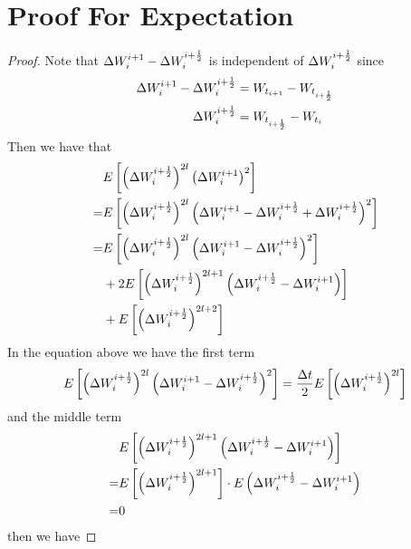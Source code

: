     \section{Proof For Expectation}
    \label{sec:proof for expectation}
    \begin{proof}
        Note that $\Delta W_{i}^{i+1}-\Delta W_{i}^{i+\frac{1}{2}}$ is independent of $\Delta W_{i}^{i+\frac{1}{2}}$ 
        since
        \[\begin{aligned}
            \Delta W_{i}^{i+1}-\Delta W_{i}^{i+\frac{1}{2}}&=W_{t_{i+1}}-W_{t_{i+\frac{1}{2}}}\\
            \Delta W_{i}^{i+\frac{1}{2}}&=W_{t_{i+\frac{1}{2}}}-W_{t_i}
        \end{aligned}\]
        Then we have that
        \[\begin{aligned}
            &E\left[
            \left(\Delta W_{i}^{i+\frac{1}{2}}\right)^{2l}
            \left(\Delta W_{i}^{i+1}\right)^2
            \right]\\
            =&E\left[
            \left(\Delta W_{i}^{i+\frac{1}{2}}\right)^{2l}
            \left(\Delta W_{i}^{i+1}-\Delta W_{i}^{i+\frac{1}{2}}+\Delta W_{i}^{i+\frac{1}{2}}\right)^2
            \right]\\
            =&\begin{aligned}[t]
            &E\left[
            \left(\Delta W_{i}^{i+\frac{1}{2}}\right)^{2l}\left(\Delta W_{i}^{i+1}-\Delta W_{i}^{i+\frac{1}{2}}\right)^2
            \right]\\
            &+2E\left[
            \left(\Delta W_{i}^{i+\frac{1}{2}}\right)^{2l+1}\left(\Delta W_{i}^{i+\frac{1}{2}}-\Delta W_{i}^{i+1}\right)
            \right]\\
            &+E\left[\left(\Delta W_{i}^{i+\frac{1}{2}}\right)^{2l+2}\right]\\
            \end{aligned}\\
        \end{aligned}\]
        In the equation above we have the first term
        \[\begin{aligned}
            E\left[
            \left(\Delta W_{i}^{i+\frac{1}{2}}\right)^{2l}\left(\Delta W_{i}^{i+1}-\Delta W_{i}^{i+\frac{1}{2}}\right)^2
            \right]
            =\frac{\Delta t}{2}E\left[\left(\Delta W_{i}^{i+\frac{1}{2}}\right)^{2l}\right]
        \end{aligned}\]
        and the middle term
        \[\begin{aligned}
            &E\left[\left(\Delta W_{i}^{i+\frac{1}{2}}\right)^{2l+1}\left(\Delta W_{i}^{i+\frac{1}{2}}-\Delta W_{i}^{i+1}\right)\right]\\
            =&
            E\left[\left(\Delta W_{i}^{i+\frac{1}{2}}\right)^{2l+1}\right]
            \cdot E\left(\Delta W_{i}^{i+\frac{1}{2}}-\Delta W_{i}^{i+1}\right)\\
            =&0\\
        \end{aligned}\]
        then we have
        \renewcommand{\theequation}{A.\arabic{equation}}

\end{proof}
